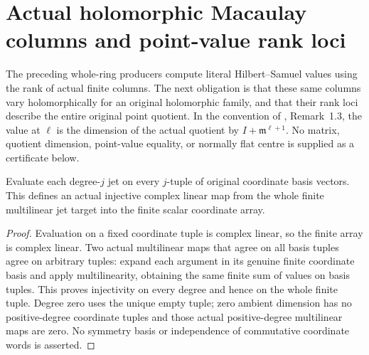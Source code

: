\section{Actual holomorphic Macaulay columns and point-value rank loci}
\label{sec:hironaka-holomorphic-jet-rank-loci}

The preceding whole-ring producers compute literal Hilbert--Samuel values
using the rank of actual finite columns. The next obligation is that these
same columns vary holomorphically for an original holomorphic family, and
that their rank loci describe the entire original point quotient. In the
convention of \cite{bierstone-milman97-invent-math}, Remark~1.3, the value
at $\ell$ is the dimension of the actual quotient by $I+\mathfrak m^{\ell+1}$.
No matrix, quotient dimension, point-value equality, or normally flat centre
is supplied as a certificate below.

\begin{lemma}
\label{hir:actual-finite-jet-coordinate-evaluation}
\leanok
{}
Evaluate each degree-$j$ jet on every $j$-tuple of original coordinate basis
vectors. This defines an actual injective complex linear map from the whole
finite multilinear jet target into the finite scalar coordinate array.
\end{lemma}
\begin{proof}
Evaluation on a fixed coordinate tuple is complex linear, so the finite
array is complex linear. Two actual multilinear maps that agree on all
basis tuples agree on arbitrary tuples: expand each argument in its genuine
finite coordinate basis and apply multilinearity, obtaining the same finite
sum of values on basis tuples. This proves injectivity on every degree and
hence on the whole finite tuple. Degree zero uses the unique empty tuple;
zero ambient dimension has no positive-degree coordinate tuples and those
actual positive-degree multilinear maps are zero. No symmetry basis or
independence of commutative coordinate words is asserted.
\end{proof}

